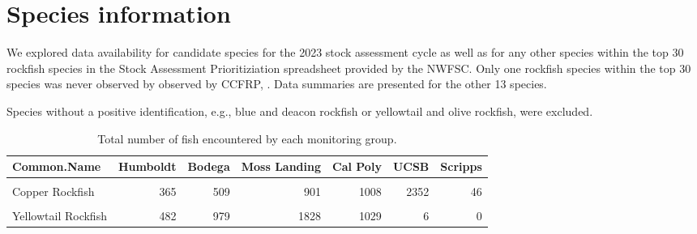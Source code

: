 \documentclass[
]{article}
\begin{document}
\FloatBarrier
\newpage

\hypertarget{species-information}{%
\section{Species information}\label{species-information}}

We explored data availability for candidate species for the 2023 stock assessment
cycle as well as for any other species within the top 30 rockfish species in the
Stock Assessment Prioritiziation spreadsheet provided by the NWFSC. Only one rockfish
species within the top 30 species was never observed by observed by CCFRP, .
Data summaries are presented for the other 13 species.

Species without a positive identification, e.g., blue and deacon rockfish or
yellowtail and olive rockfish, were excluded.

\begin{table}

\caption{\label{tab:totalfishbygroup}Total number of fish encountered by each monitoring group.}
\centering
\begin{tabular}[t]{lrrrrrr}
\toprule
Common.Name & Humboldt & Bodega & Moss Landing & Cal Poly & UCSB & Scripps\\
\midrule
\cellcolor{gray!6}{Black Rockfish} & \cellcolor{gray!6}{1296} & \cellcolor{gray!6}{1488} & \cellcolor{gray!6}{13272} & \cellcolor{gray!6}{1744} & \cellcolor{gray!6}{2} & \cellcolor{gray!6}{0}\\
Copper Rockfish & 365 & 509 & 901 & 1008 & 2352 & 46\\
\cellcolor{gray!6}{Quillback Rockfish} & \cellcolor{gray!6}{220} & \cellcolor{gray!6}{39} & \cellcolor{gray!6}{1} & \cellcolor{gray!6}{1} & \cellcolor{gray!6}{0} & \cellcolor{gray!6}{0}\\
Yellowtail Rockfish & 482 & 979 & 1828 & 1029 & 6 & 0\\
\bottomrule
\end{tabular}
\end{table}
\end{document}
